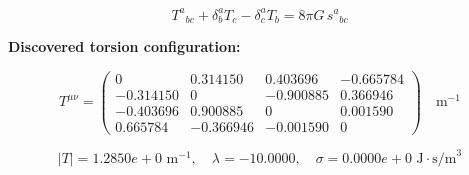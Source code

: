 
\begin{equation}
  T^a{}_{bc} + \delta^a_b T_c - \delta^a_c T_b = 8\pi G \, s^a{}_{bc}
\end{equation}

\textbf{Discovered torsion configuration:}

\begin{equation}
  T^{\mu\nu} = \begin{pmatrix}
    0 & 0.314150 & 0.403696 & -0.665784 \\
    -0.314150 & 0 & -0.900885 & 0.366946 \\
    -0.403696 & 0.900885 & 0 & 0.001590 \\
    0.665784 & -0.366946 & -0.001590 & 0
  \end{pmatrix} \quad \text{m}^{-1}
\end{equation}

\begin{equation}
  |T| = 1.2850e+0 \text{ m}^{-1}, \quad
  \lambda = -10.0000, \quad
  \sigma = 0.0000e+0 \text{ J}\cdot\text{s/m}^3
\end{equation}